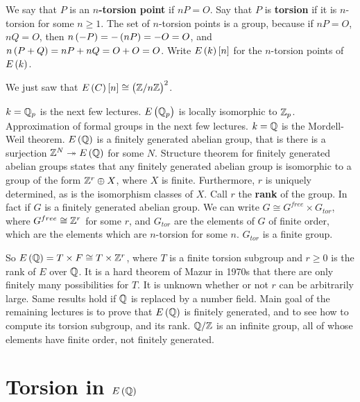 \begin{definition}
We say that $ P $ is an \textbf{$ n $-torsion point} if $ nP = O $. Say that $ P $ is \textbf{torsion} if it is $ n $-torsion for some $ n \ge 1 $. The set of $ n $-torsion points is a group, because if $ nP = O $, $ nQ = O $, then $ n\br{-P} = -\br{nP} = -O = O $, and $ n\br{P + Q} = nP + nQ = O + O = O $. Write $ E\br{k}\sbr{n} $ for the $ n $-torsion points of $ E\br{k} $.
\end{definition}

\begin{example*}
We just saw that $ E\br{C}\sbr{n} \cong \br{\Z / n\Z}^2 $.
\end{example*}

$ k = \mathbb{Q}_p $ is the next few lectures. $ E\br{\Q_p} $ is locally isomorphic to $ \mathbb{Z}_p $. Approximation of formal groups in the next few lectures. $ k = \mathbb{Q} $ is the Mordell-Weil theorem. $ E\br{\Q} $ is a finitely generated abelian group, that is there is a surjection $ \Z^N \twoheadrightarrow E\br{\Q} $ for some $ N $. Structure theorem for finitely generated abelian groups states that any finitely generated abelian group is isomorphic to a group of the form $ \mathbb{Z}^r \oplus X $, where $ X $ is finite. Furthermore, $ r $ is uniquely determined, as is the isomorphism classes of $ X $. Call $ r $ the \textbf{rank} of the group. In fact if $ G $ is a finitely generated abelian group. We can write $ G \cong G^{free} \times G_{tor} $, where $ G^{free} \cong \mathbb{Z}^r $ for some $ r $, and $ G_{tor} $ are the elements of $ G $ of finite order, which are the elements which are $ n $-torsion for some $ n $. $ G_{tor} $ is a finite group.


So $ E\br{\Q} = T \times F \cong T \times \Z^r $, where $ T $ is a finite torsion subgroup and $ r \ge 0 $ is the rank of $ E $ over $ \mathbb{Q} $. It is a hard theorem of Mazur in 1970s that there are only finitely many possibilities for $ T $. It is unknown whether or not $ r $ can be arbitrarily large. Same results hold if $ \mathbb{Q} $ is replaced by a number field. Main goal of the remaining lectures is to prove that $ E\br{\Q} $ is finitely generated, and to see how to compute its torsion subgroup, and its rank. $ \mathbb{Q} / \mathbb{Z} $ is an infinite group, all of whose elements have finite order, not finitely generated.

\pagebreak

\section{Torsion in $ E\br{\Q} $}

